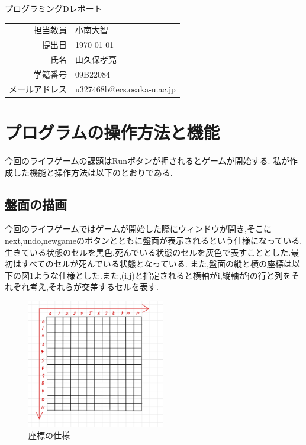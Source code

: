 \documentclass[dvipdfmx]{jarticle}
\begin{document}
\begin{titlepage}
    \begin{center}
        \vspace*{60pt}
        {\LARGE プログラミングDレポート}
        \vspace*{240pt}\\
        \begin{tabular}{rl}
            担当教員 & 小南大智\\
            提出日 & \today\\
            氏名 & 山久保孝亮\\
            学籍番号 & 09B22084\\
            メールアドレス & u327468b@ecs.osaka-u.ac.jp
        \end{tabular}
    \end{center}
\end{titlepage}

\section{プログラムの操作方法と機能}
今回のライフゲームの課題はRunボタンが押されるとゲームが開始する.
私が作成した機能と操作方法は以下のとおりである.
\subsection{盤面の描画}
今回のライフゲームではゲームが開始した際にウィンドウが開き,そこにnext,undo,newgameのボタンとともに盤面が表示されるという仕様になっている.
生きている状態のセルを黒色,死んでいる状態のセルを灰色で表すこととした.最初はすべてのセルが死んでいる状態となっている.
また,盤面の縦と横の座標は以下の図1ような仕様とした.また,(i,j)と指定されると横軸がi,縦軸がjの行と列をそれぞれ考え,それらが交差するセルを表す.
\begin{figure}[h]
  \centering
  \includegraphics[width=6cm]{zahyou.png}
  \caption{座標の仕様}
\end{figure}
\end{document}
